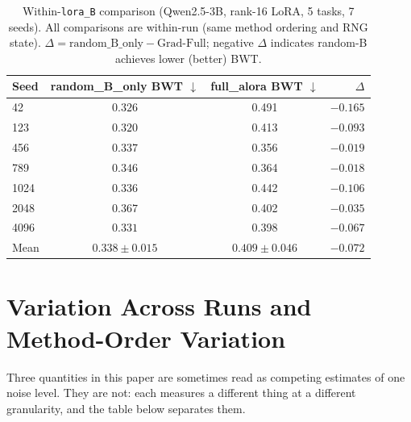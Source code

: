 \begin{table}[t]
\caption{Within-\texttt{lora\_B} comparison (Qwen2.5-3B, rank-16 LoRA, 5 tasks, 7 seeds). All comparisons are within-run (same method ordering and RNG state). $\Delta = \text{random\_B\_only} - \text{Grad-Full}$; negative $\Delta$ indicates random-B achieves lower (better) BWT.}
\label{tab:within_b}
\centering
\small
\begin{tabular}{@{}lccr@{}}
\toprule
\textbf{Seed} & \textbf{random\_B\_only BWT $\downarrow$} & \textbf{full\_alora BWT $\downarrow$} & \textbf{$\Delta$} \\
\midrule
42  & $\mathbf{0.326}$ & 0.491 & $-0.165$ \\
123 & $\mathbf{0.320}$ & 0.413 & $-0.093$ \\
456 & $\mathbf{0.337}$ & 0.356 & $-0.019$ \\
789 & $\mathbf{0.346}$ & 0.364 & $-0.018$ \\
1024 & $\mathbf{0.336}$ & 0.442 & $-0.106$ \\
2048 & $\mathbf{0.367}$ & 0.402 & $-0.035$ \\
4096 & $\mathbf{0.331}$ & 0.398 & $-0.067$ \\
\midrule
Mean & $\mathbf{0.338} \pm 0.015$ & $0.409 \pm 0.046$ & $-0.072$ \\
\bottomrule
\end{tabular}
\end{table}

\section{Variation Across Runs and Method-Order Variation}
\label{app:nf4_drift}

Three quantities in this paper are sometimes read as competing estimates of one
noise level. They are not: each measures a different thing at a different
granularity, and the table below separates them.

